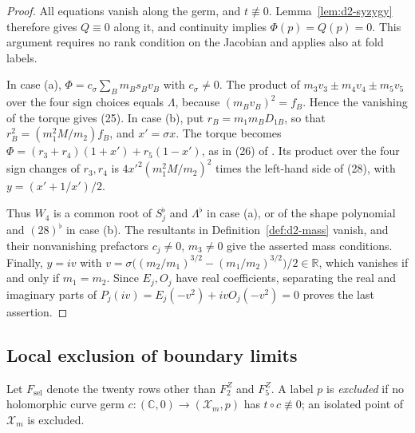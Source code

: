 \documentclass[11pt]{amsart}
\theoremstyle{definition}
\theoremstyle{remark}
\newcommand{\C}{\mathbb{C}}
\newcommand{\R}{\mathbb{R}}
\begin{document}
\begin{proof}
{All equations vanish along the germ, and $t\not\equiv0$.
Lemma~\ref{lem:d2-syzygy} therefore gives $Q\equiv0$ along it, and continuity implies
$\Phi(p)=Q(p)=0$.  This argument requires no rank condition on the Jacobian and applies
also at fold labels.}

{In case (a), $\Phi=c_\sigma\sum_Bm_Bs_Bv_B$ with $c_\sigma\ne0$.
The product of $m_3v_3\pm m_4v_4\pm m_5v_5$ over the four sign choices equals $\Lambda$,
because $(m_Bv_B)^2=f_B$.  Hence the vanishing of the torque gives (25).
In case (b), put $r_B=m_1m_BD_{1B}$, so that $r_B^2=(m_1^2M/m_2)f_B$, and $x'=\sigma x$.
The torque becomes $\Phi=(r_3+r_4)(1+x')+r_5(1-x')$, as in (26) of \cite[\S8.2]{AK}.
Its product over the four sign changes of $r_3,r_4$ is $4x'^2(m_1^2M/m_2)^2$ times the
left-hand side of (28), with $y=(x'+1/x')/2$.}

{Thus $W_4$ is a common root of $S_j^\flat$ and $\Lambda^\flat$ in
case (a), or of the shape polynomial and $(28)^\flat$ in case (b).
The resultants in Definition~\ref{def:d2-mass} vanish, and their nonvanishing prefactors
$c_j\ne0$, $m_3\ne0$ give the asserted mass conditions.
Finally, $y=iv$ with $v=\sigma\bigl((m_2/m_1)^{3/2}-(m_1/m_2)^{3/2}\bigr)/2\in\R$,
which vanishes if and only if $m_1=m_2$.
Since $E_j,O_j$ have real coefficients, separating the real and imaginary parts of
$P_j(iv)=E_j(-v^2)+ivO_j(-v^2)=0$ proves the last assertion.}
\end{proof}

\subsection{\texorpdfstring{Local exclusion of boundary limits}{Local exclusion of boundary limits}}\label{sec:d2-isolation}

Let $F_{\mathrm{sel}}$ denote the twenty rows other than $F^Z_2$ and $F^Z_5$.  A label $p$ is
\emph{excluded} if no holomorphic curve germ $c\colon(\C,0)\to(\mathcal X_m,p)$ has
$t\circ c\not\equiv0$; an isolated point of $\mathcal X_m$ is excluded.
\end{document}
